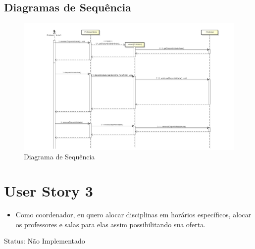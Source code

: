 \documentclass{abnt}
\begin{document}
		\FloatBarrier
		\begin{landscape}
		\subsection{Diagramas de Sequência}
						\begin{figure}[h]
							\begin{center}
							\includegraphics[width=500px]{SequenceDisponibilidade}
							\caption{Diagrama de Sequência}
							\label{fig:SequenceDisponibilidade}
							\end{center}				
						\end{figure}
						\FloatBarrier
		\end{landscape}
			
	\clearpage
	\section{User Story 3}

		\begin{itemize}
			\item Como coordenador, eu quero alocar disciplinas em horários específicos, alocar os professores e salas para elas assim possibilitando sua oferta.
		\end{itemize}
		
		Status: Não Implementado
		
\end{document}
